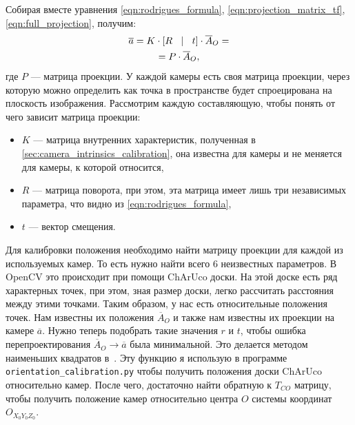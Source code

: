 \documentclass[14pt, a4paper]{extarticle}
\begin{document}
Собирая вместе уравнения \eqref{eqn:rodrigues_formula},
\eqref{eqn:projection_matrix_tf}, \eqref{eqn:full_projection}, получим:
\begin{equation}
\begin{gathered}
    \overline{a} = K \cdot \left[R \quad \vline \quad t\right] \cdot \overline{A}_O = \\
    = P \cdot \overline{A}_O,
\end{gathered}
\label{eqn:proj_fomula_with_projection_matrix}
\end{equation}
где $P$ --- матрица проекции. У каждой камеры есть своя матрица проекции, через
которую можно определить как точка в пространстве будет спроецирована на
плоскость изображения.
Рассмотрим каждую составляющую, чтобы понять от чего зависит матрица проекции:
\begin{itemize}
    \item $K$ --- матрица внутренних характеристик, полученная в
    \ref{sec:camera_intrinsics_calibration}, она известна для камеры и не
    меняется для камеры, к которой относится,

    \item $R$ --- матрица поворота, при этом, эта матрица имеет лишь три
    независимых параметра, что видно из \ref{eqn:rodrigues_formula},

    \item $t$ --- вектор смещения.
\end{itemize}

Для калибровки положения необходимо найти матрицу проекции для каждой из
используемых камер. То есть нужно найти всего 6 неизвестных параметров. В OpenCV
это происходит при помощи ChArUco доски. На этой доске есть ряд характерных
точек, при этом, зная размер доски, легко рассчитать расстояния между этими
точками. Таким образом, у нас есть относительные положения точек. Нам известны
их положения $\overline{A}_O$ и также нам известны их проекции на камере
$\overline{a}$. Нужно теперь подобрать такие значения $r$ и $t$, чтобы ошибка
перепроектирования $\overline{A}_O \rightarrow \overline{a}$ была минимальной.
Это делается методом наименьших квадратов в~\cite{opencv_charuco_pose}. Эту функцию
я использую в программе \texttt{orientation\_calibration.py} чтобы
получить положения доски ChArUco относительно камер. После чего, достаточно
найти обратную к $T_{CO}$ матрицу, чтобы получить положение камер относительно
центра $O$ системы координат $O_{X_0Y_0Z_0}$.
\end{document}
